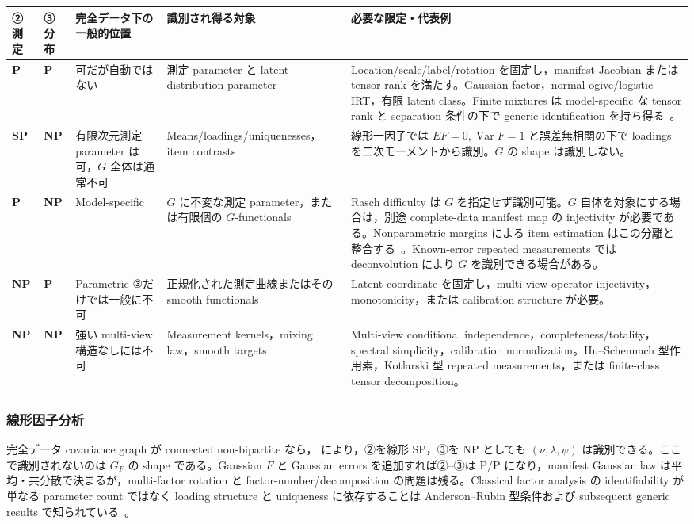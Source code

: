\documentclass[11pt,a4paper]{ltjsarticle}
\theoremstyle{remark}
\newcommand{\Var}{\operatorname{Var}}
\begin{document}
\begin{center}
\footnotesize
\begin{tabularx}{0.99\textwidth}{>{\bfseries}p{18mm}>{\bfseries}p{18mm}p{36mm}p{39mm}X}
\toprule
②測定 & ③分布 & 完全データ下の一般的位置 & 識別され得る対象 & 必要な限定・代表例\\
\midrule
P & P
& 可だが自動ではない
& 測定 parameter と latent-distribution parameter
& Location/scale/label/rotation を固定し，manifest Jacobian または tensor rank を満たす。Gaussian factor，normal-ogive/logistic IRT，有限 latent class。Finite mixtures は model-specific な tensor rank と separation 条件の下で generic identification を持ち得る~\cite{Allman2009}。\\
\addlinespace
SP & NP
& 有限次元測定 parameter は可，$G$ 全体は通常不可
& Means/loadings/uniquenesses，item contrasts
& 線形一因子では $E F=0,\Var F=1$ と誤差無相関の下で loadings を二次モーメントから識別。$G$ の shape は識別しない。\\
\addlinespace
P & NP
& Model-specific
& $G$ に不変な測定 parameter，または有限個の $G$-functionals
& Rasch difficulty は $G$ を指定せず識別可能。$G$ 自体を対象にする場合は，別途 complete-data manifest map の injectivity が必要である。Nonparametric margins による item estimation はこの分離と整合する~\cite{Follmann1988}。Known-error repeated measurements では deconvolution により $G$ を識別できる場合がある。\\
\addlinespace
NP & P
& Parametric ③だけでは一般に不可
& 正規化された測定曲線またはその smooth functionals
& Latent coordinate を固定し，multi-view operator injectivity，monotonicity，または calibration structure が必要。\\
\addlinespace
NP & NP
& 強い multi-view 構造なしには不可
& Measurement kernels，mixing law，smooth targets
& Multi-view conditional independence，completeness/totality，spectral simplicity，calibration normalization。Hu--Schennach 型作用素，Kotlarski 型 repeated measurements，または finite-class tensor decomposition。\\
\bottomrule
\end{tabularx}
\end{center}

\subsubsection{線形因子分析}
完全データ covariance graph が connected non-bipartite なら， により，②を線形 SP，③を NP としても $(\nu,\lambda,\psi)$ は識別できる。ここで識別されないのは $G_F$ の shape である。Gaussian $F$ と Gaussian errors を追加すれば②--③は P/P になり，manifest Gaussian law は平均・共分散で決まるが，multi-factor rotation と factor-number/decomposition の問題は残る。Classical factor analysis の identifiability が単なる parameter count ではなく loading structure と uniqueness に依存することは Anderson--Rubin 型条件および subsequent generic results で知られている~\cite{AndersonRubin1956,BekkerTenBerge1997}。
\end{document}
